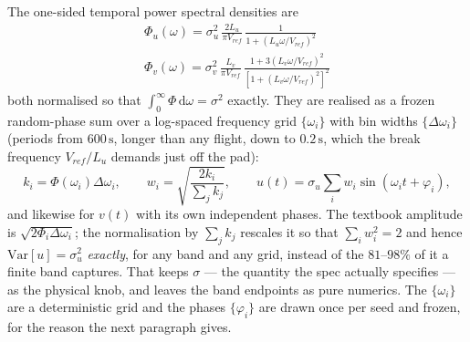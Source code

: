 The one-sided temporal power spectral densities are
\begin{gather}
    \Phi_u(\omega) = \sigma_u^2\,\frac{2L_u}{\pi V_{ref}}\,\frac{1}{1+\left(L_u\omega/V_{ref}\right)^2}
        \label{eq:dryden_psd_u} \\
    \Phi_v(\omega) = \sigma_v^2\,\frac{L_v}{\pi V_{ref}}\,
        \frac{1+3\left(L_v\omega/V_{ref}\right)^2}{\left[1+\left(L_v\omega/V_{ref}\right)^2\right]^2}
        \label{eq:dryden_psd_v}
\end{gather}
both normalised so that $\int_0^\infty\Phi\,\mathrm{d}\omega=\sigma^2$ exactly. They are realised
as a frozen random-phase sum over a log-spaced frequency grid $\{\omega_i\}$ with bin widths
$\{\Delta\omega_i\}$ (periods from $600\,\mathrm{s}$, longer than any flight, down to
$0.2\,\mathrm{s}$, which the break frequency $V_{ref}/L_u$ demands just off the pad):
\begin{equation} \label{eq:dryden_synthesis}
    k_i = \Phi(\omega_i)\Delta\omega_i, \qquad
    w_i = \sqrt{\frac{2k_i}{\sum_jk_j}}, \qquad
    u(t) = \sigma_u\sum_i w_i\sin(\omega_it+\varphi_i),
\end{equation}
and likewise for $v(t)$ with its own independent phases. The textbook amplitude is
$\sqrt{2\Phi_i\Delta\omega_i}$; the normalisation by $\sum_jk_j$ rescales it so that $\sum_iw_i^2=2$
and hence $\mathrm{Var}[u]=\sigma_u^2$ \emph{exactly}, for any band and any grid, instead of the
$81$--$98\%$ of it a finite band captures. That keeps $\sigma$ --- the quantity the spec actually
specifies --- as the physical knob, and leaves the band endpoints as pure numerics. The
$\{\omega_i\}$ are a deterministic grid and the phases $\{\varphi_i\}$ are drawn once per seed and
frozen, for the reason the next paragraph gives.

